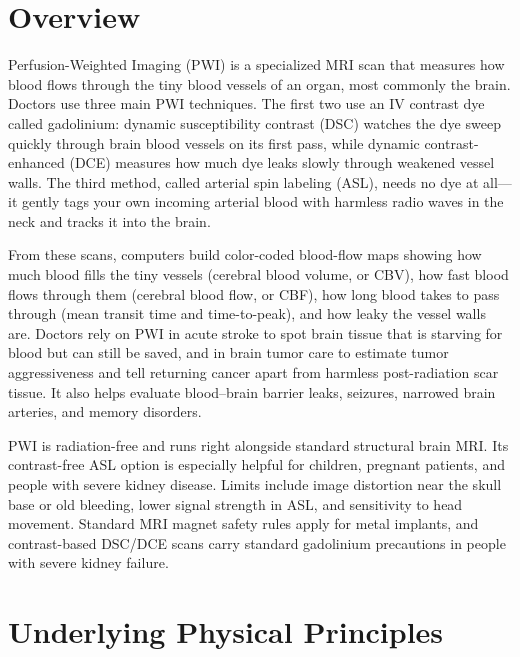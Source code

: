 \label{ch:infographic-pwi}

\section{Overview}

Perfusion-Weighted Imaging (PWI) is a specialized MRI scan that measures how blood flows through the tiny blood vessels of an organ, most commonly the brain. Doctors use three main PWI techniques. The first two use an IV contrast dye called gadolinium: dynamic susceptibility contrast (DSC) watches the dye sweep quickly through brain blood vessels on its first pass, while dynamic contrast-enhanced (DCE) measures how much dye leaks slowly through weakened vessel walls. The third method, called arterial spin labeling (ASL), needs no dye at all---it gently tags your own incoming arterial blood with harmless radio waves in the neck and tracks it into the brain.

From these scans, computers build color-coded blood-flow maps showing how much blood fills the tiny vessels (cerebral blood volume, or CBV), how fast blood flows through them (cerebral blood flow, or CBF), how long blood takes to pass through (mean transit time and time-to-peak), and how leaky the vessel walls are. Doctors rely on PWI in acute stroke to spot brain tissue that is starving for blood but can still be saved, and in brain tumor care to estimate tumor aggressiveness and tell returning cancer apart from harmless post-radiation scar tissue. It also helps evaluate blood--brain barrier leaks, seizures, narrowed brain arteries, and memory disorders.

PWI is radiation-free and runs right alongside standard structural brain MRI. Its contrast-free ASL option is especially helpful for children, pregnant patients, and people with severe kidney disease. Limits include image distortion near the skull base or old bleeding, lower signal strength in ASL, and sensitivity to head movement. Standard MRI magnet safety rules apply for metal implants, and contrast-based DSC/DCE scans carry standard gadolinium precautions in people with severe kidney failure.

\section{Underlying Physical Principles}

